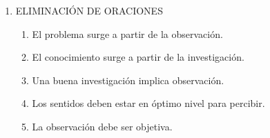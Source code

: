 \begin{enumerate}[resume]
	\[
	\text{nombre de enfermedad o inflamación} : \text{órgano o parte afectada}
	\]
	
	Analicemos el primer par:
	
	\begin{itemize}[label=--]
		\item \textit{Adenitis} = inflamación de las glándulas.
	\end{itemize}
	
	Entonces debemos buscar otra relación semejante:
	
	\[
	\text{inflamación} : \text{órgano afectado}
	\]
	
	Revisemos las opciones:
	
	\begin{itemize}[label=--]
		\item a) \textit{cistitis} : cejas\\
		Cistitis es inflamación de la vejiga, no de las cejas.
		
		\item b) \textit{otitis} : oídos\\
		Otitis es inflamación del oído. La relación es correcta.
		
		\item c) \textit{meningitis} : meniscos\\
		Meningitis es inflamación de las meninges, no de los meniscos.
		
		\item d) \textit{poliomielitis} : huesos\\
		La poliomielitis afecta el sistema nervioso, no los huesos.
		
		\item e) \textit{blefaritis} : labios\\
		Blefaritis es inflamación de los párpados, no de los labios.
	\end{itemize}
	
	La única alternativa que conserva exactamente la misma relación es:
	
	\[
	\text{otitis} : \text{oídos}
	\]
	

	
	\vspace{6mm}
	
	\item ELIMINACIÓN DE ORACIONES
	
	\begin{enumerate}[label=\alph*)]
		\item El problema surge a partir de la observación.
		\item El conocimiento surge a partir de la investigación.
		\item Una buena investigación implica observación.
		\item Los sentidos deben estar en óptimo nivel para percibir.
		\item La observación debe ser objetiva.
	\end{enumerate}
	

\end{enumerate}
